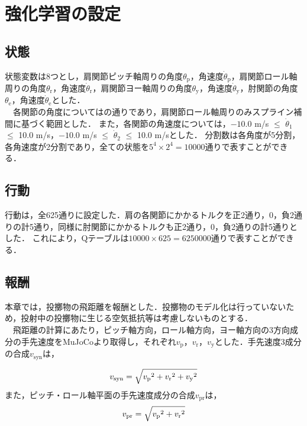 \section{強化学習の設定}
\subsection{状態}
状態変数は8つとし，肩関節ピッチ軸周りの角度$\theta_{\mathrm{p}}$，角速度$\dot{\theta}_{\mathrm{p}}$，肩関節ロール軸周りの角度$\theta_{\mathrm{r}}$，角速度$\dot{\theta}_{\mathrm{r}}$，肩関節ヨー軸周りの角度$\theta_{\mathrm{y}}$，角速度$\dot{\theta}_{\mathrm{y}}$，肘関節の角度$\theta_{\mathrm{e}}$，角速度$\dot{\theta}_{\mathrm{e}}$とした．\\
　各関節の角度についてはの通りであり，肩関節ロール軸周りのみスプライン補間に基づく範囲とした．
また，各関節の角速度については，$-10.0$ m/s $\le$ $\dot{\theta}_{1}$ $\le$ 10.0 m/s，$-10.0$ m/s $\le$ $\dot{\theta}_{2}$ $\le$ 10.0 m/sとした．
分割数は各角度が5分割，各角速度が2分割であり，全ての状態を$5^{4}\times 2^{4}=10000$通りで表すことができる．
\subsection{行動}
行動は，全625通りに設定した．肩の各関節にかかるトルクを正2通り，0，負2通りの計5通り，同様に肘関節にかかるトルクも正2通り，0，負2通りの計5通りとした．
これにより，Qテーブルは$10000 \times 625=6250000$通りで表すことができる．
\subsection{報酬}
本章では，投擲物の飛距離を報酬とした．投擲物のモデル化は行っていないため，投射中の投擲物に生じる空気抵抗等は考慮しないものとする．\\
　飛距離の計算にあたり，ピッチ軸方向，ロール軸方向，ヨー軸方向の3方向成分の手先速度をMuJoCoより取得し，それぞれ$v_{\mathrm{p}}$，$v_{\mathrm{r}}$，$v_{\mathrm{y}}$とした．手先速度3成分の合成$v_{\mathrm{syn}}$は，

\begin{eqnarray}
  \equlabel{5.1}
  v_{\mathrm{syn}} = \sqrt{{v_{\mathrm{p}}}^{2} + {v_{\mathrm{r}}}^{2} + {v_{\mathrm{y}}}^{2}}
\end{eqnarray}
また，ピッチ・ロール軸平面の手先速度成分の合成$v_{\mathrm{pr}}$は，
\begin{eqnarray}
  \equlabel{5.2}
  v_{\mathrm{pr}} = \sqrt{{v_{\mathrm{p}}}^{2} + {v_{\mathrm{r}}}^{2}}
\end{eqnarray}

